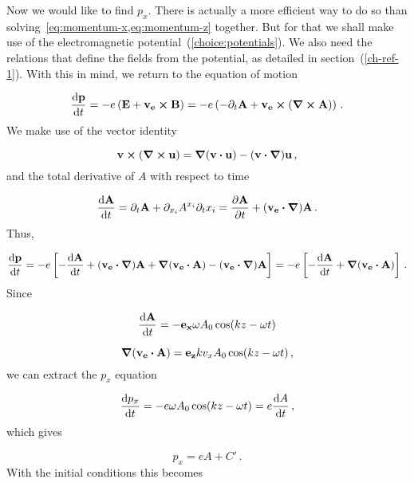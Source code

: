 \documentclass[12pt, class=report, crop=false]{standalone}
\begin{document}
Now we would like to find \(p_x\). There is actually a more efficient way to do so than solving~\cref{eq:momentum-x,eq:momentum-z} together. But for that we shall make use of the electromagnetic potential~(\ref{choice:potentials}). We also need the relations that define the fields from the potential, as detailed in section~(\ref{ch-ref-1}). With this in mind, we return to the equation of motion

\begin{equation}
  \dv{\vb{p}}{t} = - e \left( \vb{E} + \vb{v_e}\cp\vb{B} \right) = -e \left( -\partial_t \vb{A} + \vb{v_e}\cp(\curl{\vb{A}}) \right)\,.
\end{equation}
We make use of the vector identity

\begin{equation}
  \label{id:vp-of-curl}
  \vb{v}\cp(\curl{\vb{u}}) = \grad{(\vb{v}\vdot\vb{u})} - (\vb{v}\vdot \grad) \vb{u}\,,
\end{equation}
and the total derivative of \(A\) with respect to time

\begin{equation}
  \dv{\vb{A}}{t} =
  \partial_t \vb{A} + \partial_{x_i} A^{x_i} \partial_t x_i =
  \pdv{\vb{A}}{t} + (\vb{v_e}\vdot \grad) \vb{A}\,.
\end{equation}
Thus,

\begin{equation}
  \dv{\vb{p}}{t} = - e \left[ -\dv{\vb{A}}{t} + (\vb{v_e}\vdot \grad) \vb{A} + \grad{(\vb{v_e}\vdot\vb{A})} - (\vb{v_e}\vdot \grad) \vb{A} \right] = - e \left[ -\dv{\vb{A}}{t} + \grad{(\vb{v_e}\vdot\vb{A})} \right]\,.
\end{equation}
Since

\begin{equation*}
  \dv{\vb{A}}{t} = - \vb{e_x} \omega A_0 \cos(kz-\omega t)
\end{equation*}

\begin{equation*}
  \grad{(\vb{v_e}\vdot\vb{A})} = \vb{e_z} k v_x A_0 \cos(kz-\omega t)\,,
\end{equation*}
we can extract the \(p_x\) equation

\begin{equation}
  \dv{p_x}{t} = - e \omega A_0 \cos(kz-\omega t) = e \dv{A}{t}\,,
\end{equation}
which gives

\begin{equation}
  p_x = eA + C'\,.
\end{equation}
With the initial conditions this becomes
\end{document}
